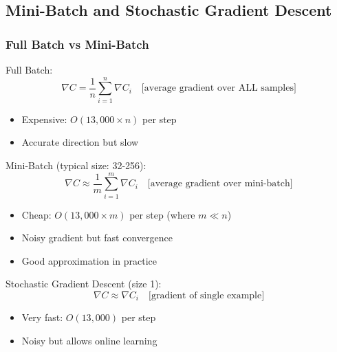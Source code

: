 \documentclass[11pt,a4paper]{article}
\begin{document}
\subsection{Mini-Batch and Stochastic Gradient Descent}

\subsubsection{Full Batch vs Mini-Batch}

Full Batch:
\[
\nabla C = \frac{1}{n} \sum_{i=1}^{n} \nabla C_i \quad \text{[average gradient over ALL samples]}
\]
\begin{itemize}
    \item Expensive: $O(13,000 \times n)$ per step
    \item Accurate direction but slow
\end{itemize}

Mini-Batch (typical size: 32-256):
\[
\nabla C \approx \frac{1}{m} \sum_{i=1}^{m} \nabla C_i \quad \text{[average gradient over mini-batch]}
\]
\begin{itemize}
    \item Cheap: $O(13,000 \times m)$ per step (where $m \ll n$)
    \item Noisy gradient but fast convergence
    \item Good approximation in practice
\end{itemize}

Stochastic Gradient Descent (size 1):
\[
\nabla C \approx \nabla C_i \quad \text{[gradient of single example]}
\]
\begin{itemize}
    \item Very fast: $O(13,000)$ per step
    \item Noisy but allows online learning
\end{itemize}
\end{document}
